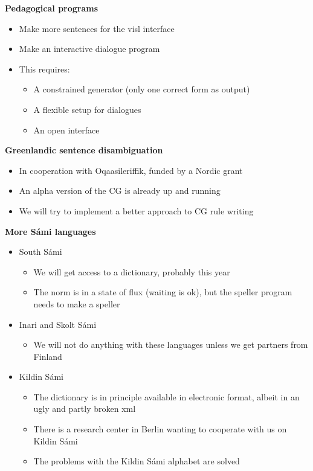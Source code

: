 \documentclass[landscape,english,11pt]{seminar}
\begin{document}
\begin{slide}
\newslide
\textbf{Pedagogical programs}
\begin{itemize}
\item Make more sentences for the visl interface
\item Make an interactive dialogue program
\item This requires:
\begin{itemize}
\item A constrained generator (only one correct form as output)
\item A flexible setup for dialogues
\item An open interface
\end{itemize}
\end{itemize}

\newslide
\textbf{Greenlandic sentence disambiguation}
\begin{itemize}
\item In cooperation with Oqaasileriffik, funded by a Nordic grant
\item An alpha version of the CG is already up and running
\item We will try to implement a better approach to CG rule writing
\end{itemize}

\newslide
\textbf{More Sámi languages}
\begin{itemize}
\item South Sámi
\begin{itemize}
\item We will get access to a dictionary, probably this year
\item The norm is in a state of flux (waiting is ok), but the speller program needs to make a speller
\end{itemize}
\item Inari and Skolt Sámi
\begin{itemize}
\item We will not do anything with these languages unless we get partners from Finland
\end{itemize}
\item Kildin Sámi
\begin{itemize}
\item The dictionary is in principle available in electronic format, albeit in an ugly and partly broken xml
\item There is a research center in Berlin wanting to cooperate with us on Kildin Sámi
\item The problems with the Kildin Sámi alphabet are solved
\end{itemize}
\end{itemize}


\end{slide}
\end{document}
